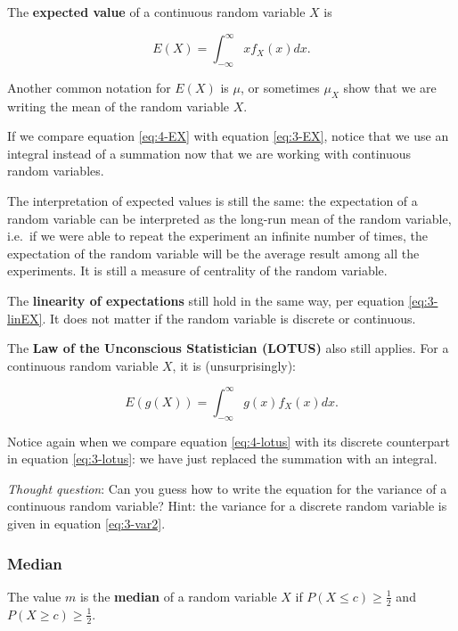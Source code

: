 \documentclass[
]{book}
\begin{document}
The \textbf{expected value} of a continuous random variable \(X\) is

\begin{equation} 
E(X) = \int_{-\infty}^{\infty} x f_X(x) dx.
\label{eq:4-EX}
\end{equation}

Another common notation for \(E(X)\) is \(\mu\), or sometimes \(\mu_X\) show that we are writing the mean of the random variable \(X\).

If we compare equation \eqref{eq:4-EX} with equation \eqref{eq:3-EX}, notice that we use an integral instead of a summation now that we are working with continuous random variables.

The interpretation of expected values is still the same: the expectation of a random variable can be interpreted as the long-run mean of the random variable, i.e.~if we were able to repeat the experiment an infinite number of times, the expectation of the random variable will be the average result among all the experiments. It is still a measure of centrality of the random variable.

The \textbf{linearity of expectations} still hold in the same way, per equation \eqref{eq:3-linEX}. It does not matter if the random variable is discrete or continuous.

The \textbf{Law of the Unconscious Statistician (LOTUS)} also still applies. For a continuous random variable \(X\), it is (unsurprisingly):

\begin{equation} 
E(g(X)) = \int_{-\infty}^{\infty} g(x) f_X(x) dx.
\label{eq:4-lotus}
\end{equation}

Notice again when we compare equation \eqref{eq:4-lotus} with its discrete counterpart in equation \eqref{eq:3-lotus}: we have just replaced the summation with an integral.

\emph{Thought question}: Can you guess how to write the equation for the variance of a continuous random variable? Hint: the variance for a discrete random variable is given in equation \eqref{eq:3-var2}.

\hypertarget{median-1}{%
\subsubsection{Median}\label{median-1}}

The value \(m\) is the \textbf{median} of a random variable \(X\) if \(P(X \leq c) \geq \frac{1}{2}\) and \(P(X \geq c) \geq \frac{1}{2}\).
\end{document}
